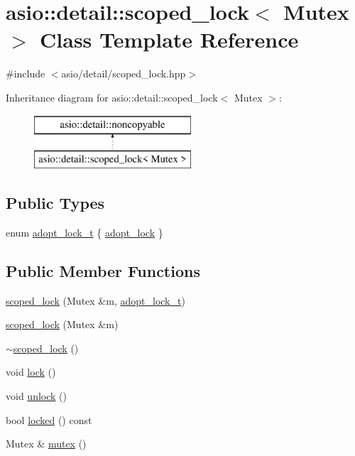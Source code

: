\hypertarget{classasio_1_1detail_1_1scoped__lock}{}\section{asio\+:\+:detail\+:\+:scoped\+\_\+lock$<$ Mutex $>$ Class Template Reference}
\label{classasio_1_1detail_1_1scoped__lock}


{\ttfamily \#include $<$asio/detail/scoped\+\_\+lock.\+hpp$>$}

Inheritance diagram for asio\+:\+:detail\+:\+:scoped\+\_\+lock$<$ Mutex $>$\+:\begin{figure}[H]
\begin{center}
\leavevmode
\includegraphics[height=2.000000cm]{classasio_1_1detail_1_1scoped__lock}
\end{center}
\end{figure}
\subsection*{Public Types}
\begin{DoxyCompactItemize}
\item 
enum \hyperlink{classasio_1_1detail_1_1scoped__lock_a85a2e4163d034f8449aa4f42ea9a00bf}{adopt\+\_\+lock\+\_\+t} \{ \hyperlink{classasio_1_1detail_1_1scoped__lock_a85a2e4163d034f8449aa4f42ea9a00bfa54c63380b373ee584131d2bfc194f83e}{adopt\+\_\+lock}
 \}
\end{DoxyCompactItemize}
\subsection*{Public Member Functions}
\begin{DoxyCompactItemize}
\item 
\hyperlink{classasio_1_1detail_1_1scoped__lock_a136d2edf2a2828f744fb88c2742173b5}{scoped\+\_\+lock} (Mutex \&m, \hyperlink{classasio_1_1detail_1_1scoped__lock_a85a2e4163d034f8449aa4f42ea9a00bf}{adopt\+\_\+lock\+\_\+t})
\item 
\hyperlink{classasio_1_1detail_1_1scoped__lock_a1973bbc24f8e8f1967120ec7b9f2ddd7}{scoped\+\_\+lock} (Mutex \&m)
\item 
\hyperlink{classasio_1_1detail_1_1scoped__lock_a8bd3010e819074fa25c14303571cd3f4}{$\sim$scoped\+\_\+lock} ()
\item 
void \hyperlink{classasio_1_1detail_1_1scoped__lock_a32b8e65d7ed6ac12ce2d3e242d861d32}{lock} ()
\item 
void \hyperlink{classasio_1_1detail_1_1scoped__lock_a27469133c476c189f7c81c7c80d222e7}{unlock} ()
\item 
bool \hyperlink{classasio_1_1detail_1_1scoped__lock_a6a5bc674ca3a271d9cf0c404d6aa72bc}{locked} () const 
\item 
Mutex \& \hyperlink{classasio_1_1detail_1_1scoped__lock_a20cf49f8ea560cbd896c3e397ab6ac7b}{mutex} ()
\end{DoxyCompactItemize}


